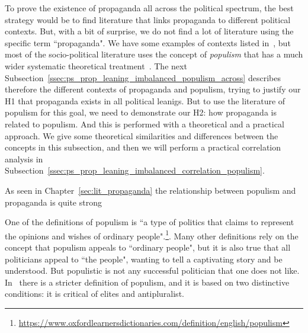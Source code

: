 
To prove the existence of propaganda all across the political spectrum, the best strategy would be to find literature that links propaganda to different political contexts. But, with a bit of surprise, we do not find a lot of literature using the specific term ``propaganda". We have some examples of contexts listed in~\cite{woolley2018computational}, but
most of the socio-political literature uses the concept of \emph{\gls{populism}} that has a much wider systematic theoretical treatment~\citep{muller2017populism,jowett2012propaganda,jowett2018propaganda}. %
The next Subsection~\ref{ssec:ps_prop_leaning_imbalanced_populism_across} describes therefore the different contexts of propaganda and populism, trying to justify our H1 that propaganda exists in all political leanigs.
But to use the literature of populism for this goal, we need to demonstrate our H2: how propaganda is related to populism. And this is performed with a theoretical and a practical approach.
We give some theoretical similarities and differences between the concepts in this subsection, and then we will perform a practical correlation analysis in Subsection~\ref{ssec:ps_prop_leaning_imbalanced_correlation_populism}.



As seen in Chapter~\ref{sec:lit_propaganda} the relationship between populism and propaganda is quite strong~\citep{tumber2021routledge,pasquino2008populism}


One of the definitions of populism is ``a type of politics that claims to represent the opinions and wishes of ordinary people".\footnote{\url{https://www.oxfordlearnersdictionaries.com/definition/english/populism}}. Many other definitions rely on the concept that populism appeals to ``ordinary people", but it is also true that all politicians appeal to ``the people", wanting to tell a captivating story and be understood.
But populistic is not any successful politician that one does not like.
In~\cite{muller2017populism} there is a stricter definition of populism, and it is based on %
two distinctive conditions: it is critical of elites and antipluralist.

